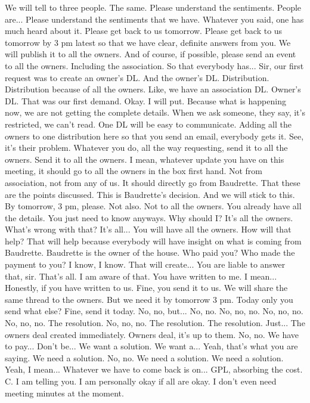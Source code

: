 We will tell to three people.
The same.
Please understand the sentiments.
People are...
Please understand the sentiments that we have.
Whatever you said,
one has much heard about it.
Please get back to us tomorrow.
Please get back to us tomorrow by 3 pm latest
so that we have clear, definite answers from you.
We will publish it to all the owners.
And of course, if possible,
please send an event to all the owners.
Including the association.
So that everybody has...
Sir, our first request was to create an owner's DL.
And the owner's DL.
Distribution.
Distribution because of all the owners.
Like, we have an association DL.
Owner's DL.
That was our first demand.
Okay.
I will put.
Because what is happening now,
we are not getting the complete details.
When we ask someone, they say,
it's restricted, we can't read.
One DL will be easy to communicate.
Adding all the owners to one distribution here
so that you send an email, everybody gets it.
See, it's their problem.
Whatever you do, all the way requesting,
send it to all the owners.
Send it to all the owners.
I mean, whatever update you have on this meeting,
it should go to all the owners in the box first hand.
Not from association, not from any of us.
It should directly go from Baudrette.
That these are the points discussed.
This is Baudrette's decision.
And we will stick to this.
By tomorrow, 3 pm, please.
Not also.
Not to all the owners.
You already have all the details.
You just need to know anyways.
Why should I?
It's all the owners.
What's wrong with that?
It's all...
You will have all the owners.
How will that help?
That will help because everybody will have
insight on what is coming from Baudrette.
Baudrette is the owner of the house.
Who paid you?
Who made the payment to you?
I know, I know.
That will create...
You are liable to answer that, sir.
That's all.
I am aware of that.
You have written to me.
I mean...
Honestly, if you have written to us.
Fine, you send it to us.
We will share the same thread to the owners.
But we need it by tomorrow 3 pm.
Today only you send what else?
Fine, send it today.
No, no, but...
No, no.
No, no, no.
No, no, no.
No, no, no.
The resolution.
No, no, no.
The resolution.
The resolution.
Just...
The owners deal created immediately.
Owners deal, it's up to them.
No, no.
We have to pay...
Don't be...
We want a solution.
We want a...
Yeah, that's what you are saying.
We need a solution.
No, no.
We need a solution.
We need a solution.
Yeah, I mean...
Whatever we have to come back is on...
GPL, absorbing the cost.
C.
I am telling you.
I am personally okay if all are okay.
I don't even need meeting minutes at the moment.
